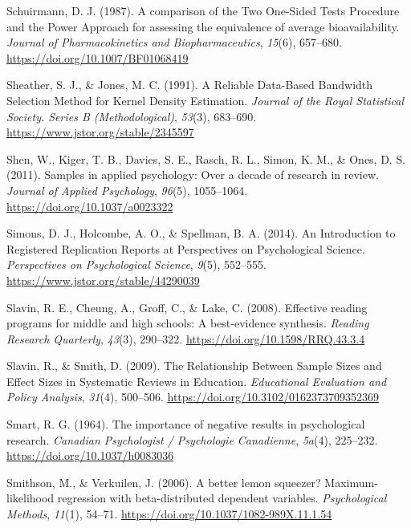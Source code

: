 \documentclass[
  12pt,
]{scrartcl}
\newlength{\cslhangindent}
\newenvironment{CSLReferences}[2] %
 {\begin{list}{}{%
  \setlength{\itemindent}{0pt}
  \setlength{\leftmargin}{0pt}
  \setlength{\parsep}{0pt}
  \ifodd #1
   \setlength{\leftmargin}{\cslhangindent}
   \setlength{\itemindent}{-1\cslhangindent}
  \fi
  \setlength{\itemsep}{#2\baselineskip}}}
 {\end{list}}
\begin{document}
\begin{CSLReferences}{1}{0}
Schuirmann, D. J. (1987). A comparison of the {Two} {One}-{Sided}
{Tests} {Procedure} and the {Power} {Approach} for assessing the
equivalence of average bioavailability. \emph{Journal of
Pharmacokinetics and Biopharmaceutics}, \emph{15}(6), 657--680.
\url{https://doi.org/10.1007/BF01068419}

Sheather, S. J., \& Jones, M. C. (1991). A {Reliable} {Data}-{Based}
{Bandwidth} {Selection} {Method} for {Kernel} {Density} {Estimation}.
\emph{Journal of the Royal Statistical Society. Series B
(Methodological)}, \emph{53}(3), 683--690.
\url{https://www.jstor.org/stable/2345597}

Shen, W., Kiger, T. B., Davies, S. E., Rasch, R. L., Simon, K. M., \&
Ones, D. S. (2011). Samples in applied psychology: {Over} a decade of
research in review. \emph{Journal of Applied Psychology}, \emph{96}(5),
1055--1064. \url{https://doi.org/10.1037/a0023322}

Simons, D. J., Holcombe, A. O., \& Spellman, B. A. (2014). An
{Introduction} to {Registered} {Replication} {Reports} at {Perspectives}
on {Psychological} {Science}. \emph{Perspectives on Psychological
Science}, \emph{9}(5), 552--555.
\url{https://www.jstor.org/stable/44290039}

Slavin, R. E., Cheung, A., Groff, C., \& Lake, C. (2008). Effective
reading programs for middle and high schools: {A} best-evidence
synthesis. \emph{Reading Research Quarterly}, \emph{43}(3), 290--322.
\url{https://doi.org/10.1598/RRQ.43.3.4}

Slavin, R., \& Smith, D. (2009). The {Relationship} {Between} {Sample}
{Sizes} and {Effect} {Sizes} in {Systematic} {Reviews} in {Education}.
\emph{Educational Evaluation and Policy Analysis}, \emph{31}(4),
500--506. \url{https://doi.org/10.3102/0162373709352369}

Smart, R. G. (1964). The importance of negative results in psychological
research. \emph{Canadian Psychologist / Psychologie Canadienne},
\emph{5a}(4), 225--232. \url{https://doi.org/10.1037/h0083036}

Smithson, M., \& Verkuilen, J. (2006). A better lemon squeezer?
{Maximum}-likelihood regression with beta-distributed dependent
variables. \emph{Psychological Methods}, \emph{11}(1), 54--71.
\url{https://doi.org/10.1037/1082-989X.11.1.54}


\end{CSLReferences}
\end{document}
